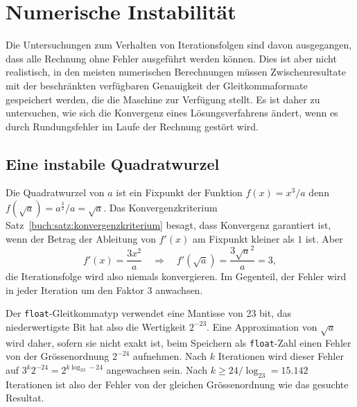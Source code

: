 %
%
%
\section{Numerische Instabilität
\label{buch:section:instabilitaet}}
%
%
Die Untersuchungen zum Verhalten von Iterationsfolgen sind davon
ausgegangen, dass alle Rechnung ohne Fehler ausgeführt werden können.
%
Dies ist aber nicht realistisch, in den meisten numerischen Berechnungen
müssen Zwischenresultate mit der beschränkten verfügbaren Genauigkeit
der Gleitkommaformate gespeichert werden, die die Maschine zur Verfügung
stellt.
%
Es ist daher zu untersuchen, wie sich die Konvergenz eines Lösungsverfahrens
ändert, wenn es durch Rundungsfehler im Laufe der Rechnung gestört wird.
%

%
%
\subsection{Eine instabile Quadratwurzel
\label{buch:subsection:quadratwurzel}}
Die Quadratwurzel von $a$ ist ein Fixpunkt der Funktion
$f(x)=x^3/a$ denn $f(\!\sqrt{a})=a^{\frac32}/a=\!\sqrt{a}$.
%
%
Das Konvergenzkriterium Satz~\ref{buch:satz:konvergenzkriterium} besagt,
dass Konvergenz garantiert ist, wenn der Betrag der Ableitung von $f'(x)$
am Fixpunkt kleiner als $1$ ist.
%
Aber
\[
f'(x) = \frac{3x^2}{a}
\quad\Rightarrow\quad
f'(\!\sqrt{a}) = \frac{3\!\sqrt{a}^2}{a}=3,
\]
die Iterationsfolge wird also niemals konvergieren.
Im Gegenteil, der Fehler wird in jeder Iteration um den Faktor $3$
anwachsen.

Der \texttt{float}-Gleitkommatyp verwendet eine Mantisse von 23 bit,
das niederwertigste Bit hat also die Wertigkeit $2^{-23}$.
Eine Approximation von $\!\sqrt{a}$ wird daher, sofern sie nicht
exakt ist, beim Speichern als \texttt{float}-Zahl einen Fehler
von der Grössenordnung $2^{-24}$ aufnehmen.
%
Nach $k$ Iterationen wird dieser Fehler auf $3^k2^{-24}=2^{k\log_23-24}$
angewachsen sein.
%
Nach $k\ge 24/\log_23=15.142$ Iterationen ist also der Fehler von der
gleichen Grössenordnung wie das gesuchte Resultat.

